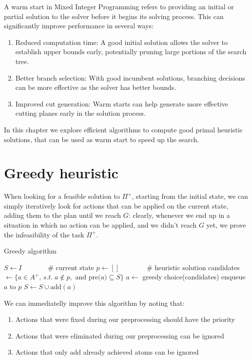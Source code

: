 A warm start in Mixed Integer Programming refers to providing an initial or partial solution to the solver before it begins its solving process. This can significantly improve performance in several ways:
\begin{enumerate}
    \item Reduced computation time: A good initial solution allows the solver to establish upper bounds early, potentially pruning large portions of the search tree.
    \item Better branch selection: With good incumbent solutions, branching decisions can be more effective as the solver has better bounds.
    \item Improved cut generation: Warm starts can help generate more effective cutting planes early in the solution process.
\end{enumerate}

In this chapter we explore efficient algorithms to compute good primal heuristic solutions, that can be used as warm start to speed up the search.

\section{Greedy heuristic}
When looking for a feasible solution to $\Pi^+$, starting from the initial state, we can simply iteratively look for actions that can be applied on the current state, adding them to the plan until we reach $G$: clearly, whenever we end up in a situation in which no action can be applied, and we didn't reach $G$ yet, we prove the infeasibility of the task $\Pi^+$.
\begin{algorithm}[h]
    \caption{Greedy algorithm}
    \begin{algorithmic}
        \State $S\gets I\qquad\quad\;\;\;$\# current state
        \State $p\gets []\qquad\qquad$\# heuristic solution
            \State candidates $\gets\{a\in A^+,\,s.t.\;a\not\in p,\mbox{ and pre(}a)\subseteq S\}$
            \State $a\gets$ greedy choice(candidates)
            \State enqueue $a$ to $p$
            \State $S\gets S\cup\mbox{add}(a)$
        \EndWhile
    \end{algorithmic}
\end{algorithm}

We can immediatelly improve this algorithm by noting that:
\begin{enumerate}
    \item Actions that were fixed during our preprocessing should have the priority
    \item Actions that were eliminated during our preprocessing can be ignored
    \item Actions that only add already achieved atoms can be ignored
\end{enumerate}

